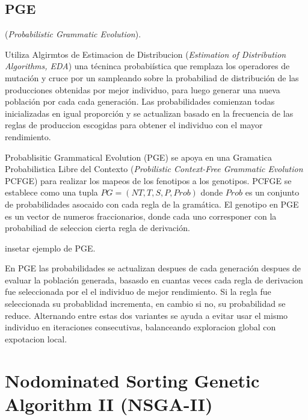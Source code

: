 \subsection{PGE}
 (\textit{Probabilistic Grammatic Evolution}).


Utiliza Algirmtos de Estimacion de Distribucion (\textit{Estimation of Distribution Algorithms, EDA}) una t\'ecninca probabi\'istica que remplaza los operadores de mutaci\'on y cruce por un sampleando sobre la probabiliad de distribuci\'on de las producciones obtenidas por mejor individuo, para luego generar una nueva poblaci\'on por cada cada generaci\'on. Las probabilidades comienzan todas inicializadas en igual proporci\'on  y se actualizan basado en la frecuencia de las reglas de produccion escogidas para obtener el individuo con el mayor rendimiento.

Probablisitic Grammatical Evolution (PGE)  se apoya en una Gramatica Probabilistica Libre del Contexto (\textit{Probilistic Context-Free Grammatic Evolution} PCFGE) para realizar los mapeos de los fenotipos a los genotipos. PCFGE se establece como una tupla $PG = (NT, T, S, P, Prob)$ donde $Prob$  es un conjunto de probabilidades asocaido con cada regla de la gram\'atica. El genotipo en PGE es un vector de numeros fraccionarios, donde cada uno corresponer con la probabiliad de seleccion cierta regla de derivaci\'on.

insetar ejemplo de PGE.

En PGE las probabilidades se actualizan despues de cada generaci\'on  despues de evaluar la poblaci\'on generada, basasdo en cuantas veces cada regla de derivacion fue seleccionada por el el individuo de mejor rendimiento. Si la regla fue seleccionada su probablidad incrementa, en cambio si no, su probabilidad se reduce. Alternando entre estas dos variantes se ayuda a evitar usar el mismo individuo en iteraciones consecutivas, balanceando exploracion global con expotacion local.

\section{Nodominated Sorting Genetic Algorithm II (NSGA-II)}

